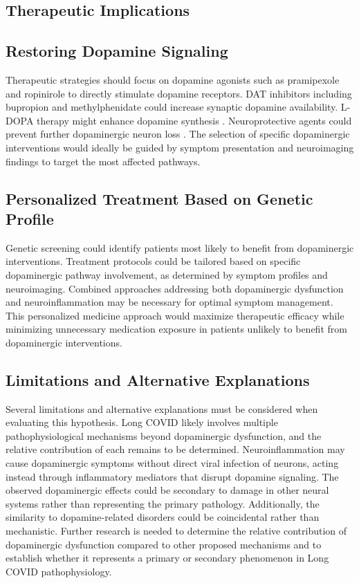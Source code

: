 \documentclass[11pt]{article}
\begin{document}
\begin{center}
\section*{Therapeutic Implications}
\end{center}

\subsection*{Restoring Dopamine Signaling}
Therapeutic strategies should focus on dopamine agonists such as pramipexole and ropinirole to directly stimulate dopamine receptors. DAT inhibitors including bupropion and methylphenidate could increase synaptic dopamine availability. L-DOPA therapy might enhance dopamine synthesis \citep{beauchamp2022parkinsonismwave, delprete2021parkinsoncovidimpact}. Neuroprotective agents could prevent further dopaminergic neuron loss \citep{limanaqi2022dopamineregulation, nataf2020ddcace2}. The selection of specific dopaminergic interventions would ideally be guided by symptom presentation and neuroimaging findings to target the most affected pathways.

\subsection*{Personalized Treatment Based on Genetic Profile}
Genetic screening could identify patients most likely to benefit from dopaminergic interventions. Treatment protocols could be tailored based on specific dopaminergic pathway involvement, as determined by symptom profiles and neuroimaging. Combined approaches addressing both dopaminergic dysfunction and neuroinflammation may be necessary for optimal symptom management. This personalized medicine approach would maximize therapeutic efficacy while minimizing unnecessary medication exposure in patients unlikely to benefit from dopaminergic interventions.

\begin{center}
\section*{Limitations and Alternative Explanations}
\end{center}
Several limitations and alternative explanations must be considered when evaluating this hypothesis. Long COVID likely involves multiple pathophysiological mechanisms beyond dopaminergic dysfunction, and the relative contribution of each remains to be determined. Neuroinflammation may cause dopaminergic symptoms without direct viral infection of neurons, acting instead through inflammatory mediators that disrupt dopamine signaling. The observed dopaminergic effects could be secondary to damage in other neural systems rather than representing the primary pathology. Additionally, the similarity to dopamine-related disorders could be coincidental rather than mechanistic. Further research is needed to determine the relative contribution of dopaminergic dysfunction compared to other proposed mechanisms and to establish whether it represents a primary or secondary phenomenon in Long COVID pathophysiology.
\end{document}
